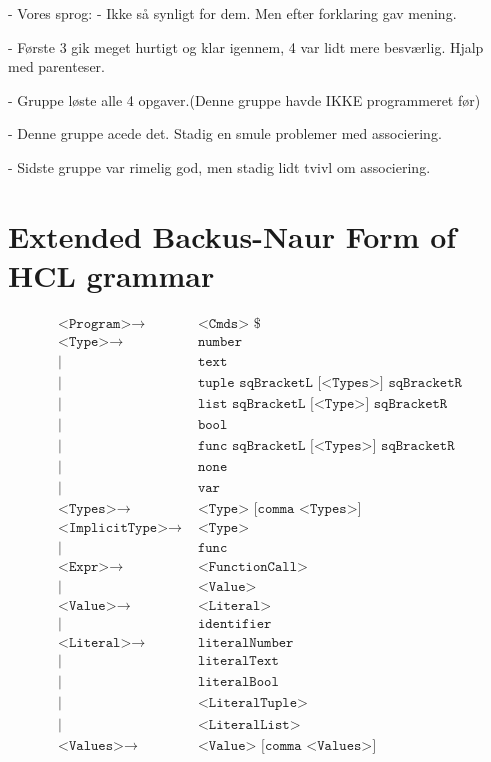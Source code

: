 - Vores sprog: 
- Ikke så synligt for dem. Men efter forklaring gav mening.

- Første 3 gik meget hurtigt og klar igennem, 4 var lidt mere besværlig. Hjalp med parenteser.

- Gruppe løste alle 4 opgaver.(Denne gruppe havde IKKE programmeret før)

- Denne gruppe acede det. Stadig en smule problemer med associering.

- Sidste gruppe var rimelig god, men stadig lidt tvivl om associering.

\section{Extended Backus-Naur Form of HCL grammar}
\label{AppendixEBNF}
\begin{align*}
	\texttt{<Program>}\to & \texttt{ <Cmds> \$}\\
	\texttt{<Type>}\to & \texttt{ number}\\
	| & \texttt{ text}\\
	| & \texttt{ tuple sqBracketL [<Types>] sqBracketR}\\
	| & \texttt{ list sqBracketL [<Type>] sqBracketR}\\
	| & \texttt{ bool}\\
	| & \texttt{ func sqBracketL [<Types>] sqBracketR}\\
	| & \texttt{ none}\\
	| & \texttt{ var}\\
	\texttt{<Types>}\to & \texttt{ <Type> [comma <Types>]}\\
	\texttt{<ImplicitType>}\to & \texttt{ <Type>}\\
	| & \texttt{ func}\\
	\texttt{<Expr>}\to & \texttt{ <FunctionCall>}\\
	| & \texttt{ <Value>}\\
	\texttt{<Value>}\to & \texttt{ <Literal>}\\
	| & \texttt{ identifier}\\
	\texttt{<Literal>}\to & \texttt{ literalNumber}\\
	| & \texttt{ literalText}\\
	| & \texttt{ literalBool}\\
	| & \texttt{ <LiteralTuple>}\\
	| & \texttt{ <LiteralList>}\\
	\texttt{<Values>}\to & \texttt{ <Value> [comma <Values>]}\\

\end{align*}
